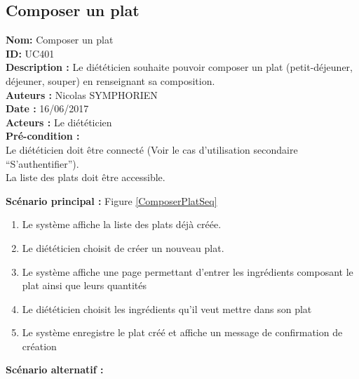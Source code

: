 \subsection{Composer un plat}

\noindent \textbf{Nom:} Composer un plat \\
\textbf{ID:} UC401\\
\textbf{Description :} Le diététicien souhaite pouvoir composer un plat (petit-déjeuner, déjeuner, souper) en renseignant sa composition.\\
\textbf{Auteurs :} Nicolas SYMPHORIEN\\
\textbf{Date :} 16/06/2017 \\
\textbf{Acteurs :} Le diététicien \\
\textbf{Pré-condition :} \\
Le diététicien doit être connecté (Voir le cas d'utilisation secondaire ``S'authentifier''). \\
La liste des plats doit être accessible.

\noindent \textbf{Scénario principal : } Figure \ref{ComposerPlatSeq}

\begin{enumerate}
	\item \label{UC401_step1}Le système affiche la liste des plats déjà créée.
	\item \label{UC401_step2}Le diététicien choisit de créer un nouveau plat.
	\item Le système affiche une page permettant d'entrer les ingrédients composant le plat ainsi que leurs quantités
	\item Le diététicien choisit les ingrédients qu'il veut mettre dans son plat
	\item Le système enregistre le plat créé et affiche un message de confirmation de création
\end{enumerate}

 \noindent \textbf{Scénario alternatif :}

